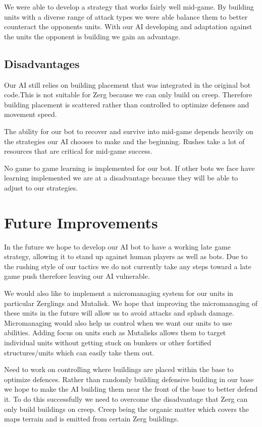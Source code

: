 \documentclass{article}
\begin{document}
We were able to develop a strategy that works fairly well mid-game. By building units with a diverse range of attack types we were able balance them to better counteract the opponents units. With our AI developing and adaptation against the units the opponent is building we gain an advantage.

\subsection{Disadvantages}
Our AI still relies on building placement that was integrated in the original bot code.This is not suitable for Zerg because we can only build on creep. Therefore building placement is scattered rather than controlled to optimize defenses and movement speed.

The ability for our bot to recover and survive into mid-game depends heavily on the strategies our AI chooses to make and the beginning. Rushes take a lot of resources that are critical for mid-game success.

No game to game learning is implemented for our bot. If other bots we face have learning implemented we are at a disadvantage because they will be able to adjust to our strategies.

\section{Future Improvements}

In the future we hope to develop our AI bot to have a working late game strategy, allowing it to stand up against human players as well as bots. Due to the rushing style of our tactics we do not currently take any steps toward a late game push therefore leaving our AI vulnerable. 

We would also like to implement a micromanaging system for our units in particular Zerglings and Mutalisk. We hope that improving the micromanaging of these units in the future will allow us to avoid attacks and splash damage. Micromanaging would also help us control when we want our units to use abilities. Adding focus on units such as Mutalisks allows them to target individual units without getting stuck on bunkers or other fortified structures/units which can easily take them out.

Need to work on controlling where buildings are placed within the base to optimize defences. Rather than randomly building defensive building in our base we hope to make the AI building them near the front of the base to better defend it. To do this successfully we need to overcome the disadvantage that Zerg can only build buildings on creep. Creep being the organic matter which covers the maps terrain and is emitted from certain Zerg buildings.
\end{document}
